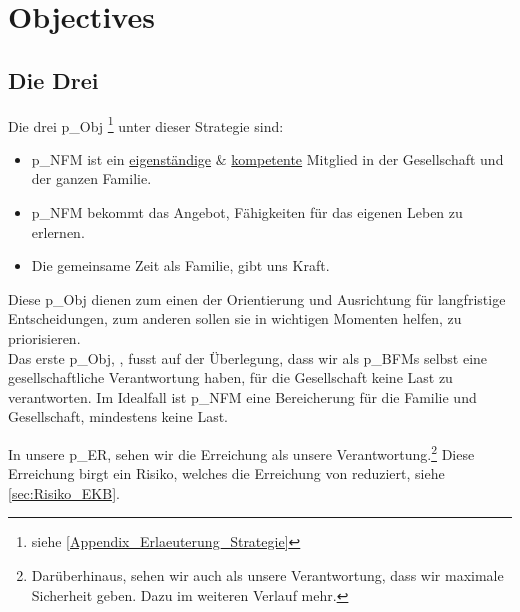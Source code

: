 

\section{Objectives} 
\subsection{Die Drei}
Die drei \gls{p_Obj} \footnote{siehe \ref{Appendix_Erlaeuterung_Strategie}} unter dieser Strategie sind:

\begin{itemize}
	\item \gls{p_NFM} ist ein \underline{eigenständige} $\&$ \underline{kompetente} Mitglied in der Gesellschaft und der ganzen Familie. \label{NFM_O_1}
	\item \gls{p_NFM} bekommt das Angebot, Fähigkeiten für das eigenen Leben zu erlernen. \label{NFM_O_2}
	\item Die gemeinsame Zeit als Familie, gibt uns Kraft. \label{NFM_O_3}
\end{itemize}


Diese \gls{p_Obj} dienen zum einen der Orientierung und Ausrichtung für langfristige Entscheidungen, zum anderen sollen sie in wichtigen Momenten helfen, zu priorisieren.\\ 

Das erste \gls{p_Obj}, \NFMOOne , fusst auf der Überlegung, dass wir als \glspl{p_BFM} selbst eine gesellschaftliche Verantwortung haben, für die Gesellschaft keine Last zu verantworten. Im Idealfall ist \gls{p_NFM} eine Bereicherung für die Familie und Gesellschaft, mindestens keine Last. 

In unsere \gls{p_ER}, sehen wir die Erreichung als unsere Verantwortung.\footnote{
	Darüberhinaus, sehen wir auch als unsere Verantwortung, dass wir maximale Sicherheit geben. Dazu im weiteren Verlauf mehr.
}
Diese Erreichung birgt ein Risiko, welches die Erreichung von \NFMOTwo reduziert, siehe \ref{sec:Risiko_EKB}.\\

